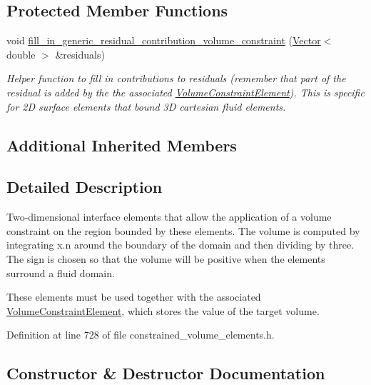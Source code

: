 \subsection*{Protected Member Functions}
\begin{DoxyCompactItemize}
\item 
void \hyperlink{classoomph_1_1SurfaceVolumeConstraintBoundingElement_a5813fa65063eb55a5b264539d77cac88}{fill\+\_\+in\+\_\+generic\+\_\+residual\+\_\+contribution\+\_\+volume\+\_\+constraint} (\hyperlink{classoomph_1_1Vector}{Vector}$<$ double $>$ \&residuals)
\begin{DoxyCompactList}\small\item\em Helper function to fill in contributions to residuals (remember that part of the residual is added by the the associated \hyperlink{classoomph_1_1VolumeConstraintElement}{Volume\+Constraint\+Element}). This is specific for 2D surface elements that bound 3D cartesian fluid elements. \end{DoxyCompactList}\end{DoxyCompactItemize}
\subsection*{Additional Inherited Members}


\subsection{Detailed Description}
Two-\/dimensional interface elements that allow the application of a volume constraint on the region bounded by these elements. The volume is computed by integrating x.\+n around the boundary of the domain and then dividing by three. The sign is chosen so that the volume will be positive when the elements surround a fluid domain.

These elements must be used together with the associated \hyperlink{classoomph_1_1VolumeConstraintElement}{Volume\+Constraint\+Element}, which stores the value of the target volume. 

Definition at line 728 of file constrained\+\_\+volume\+\_\+elements.\+h.



\subsection{Constructor \& Destructor Documentation}
\mbox{\label{classoomph_1_1SurfaceVolumeConstraintBoundingElement_a1dc9bb792bbce8f69f063a33934fc84e}} 
